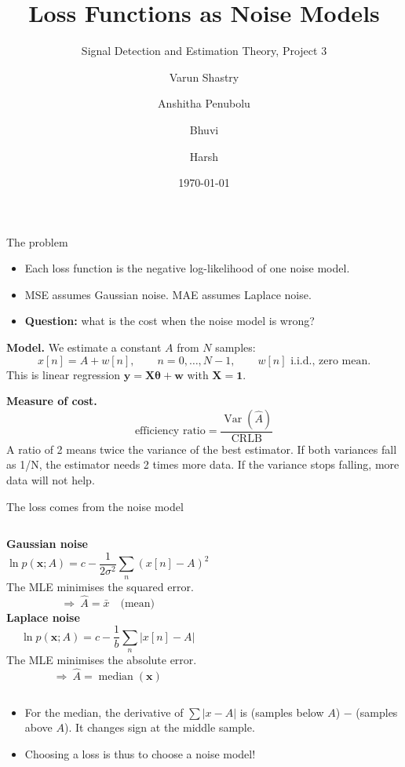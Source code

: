 \documentclass[aspectratio=169, 11pt]{beamer}
\title{Loss Functions as Noise Models}
\subtitle{Signal Detection and Estimation Theory, Project 3}
\author{Varun Shastry \and Anshitha Penubolu \and Bhuvi \and Harsh}
\date{\today}
\begin{document}
\begin{frame}
  \titlepage
\end{frame}


\begin{frame}{The problem}
  \begin{itemize}
    \item Each loss function is the negative log-likelihood of one noise model.
    \item MSE assumes Gaussian noise. MAE assumes Laplace noise.
    \item \textbf{Question:} what is the cost when the noise model is wrong?
  \end{itemize}
  \vspace{0.6em}
  \textbf{Model.} We estimate a constant $A$ from $N$ samples:
  \[
    x[n] = A + w[n], \qquad n = 0, \dots, N-1, \qquad w[n] \text{ i.i.d., zero mean.}
  \]
  This is linear regression $\mathbf{y} = \mathbf{X}\boldsymbol\theta + \mathbf{w}$ with $\mathbf{X} = \mathbf{1}$.

  \vspace{0.6em}
  \textbf{Measure of cost.}
  \[
    \text{efficiency ratio} = \frac{\operatorname{Var}(\hat A)}{\text{CRLB}}
  \]
  A ratio of 2 means twice the variance of the best estimator. If both variances fall as 1/N, the estimator needs 2 times more data. If the variance stops falling, more data will not help.
\end{frame}

\begin{frame}{The loss comes from the noise model}
  \begin{columns}[T]
    \textbf{Gaussian noise}
    \[
      \ln p(\mathbf{x}; A) = c - \frac{1}{2\sigma^2}\sum_n (x[n] - A)^2
    \]
    The MLE minimises the squared error.
    \[
      \Rightarrow\ \hat A = \bar x \quad \text{(mean)}
    \]
    \textbf{Laplace noise}
    \[
      \ln p(\mathbf{x}; A) = c - \frac{1}{b}\sum_n |x[n] - A|
    \]
    The MLE minimises the absolute error.
    \[
      \Rightarrow\ \hat A = \operatorname{median}(\mathbf{x})
    \]
  \end{columns}
  \vspace{1em}
  \begin{itemize}
    \item For the median, the derivative of $\sum|x-A|$ is (samples below $A$) $-$ (samples above $A$). It changes sign at the middle sample.
    \item Choosing a loss is thus to choose a noise model!
  \end{itemize}
\end{frame}
\end{document}
